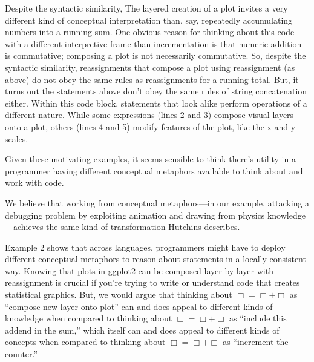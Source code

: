 \begin{Shaded}
\begin{Highlighting}[numbers=left,,]
\StringTok{ }\NormalTok{()}
\StringTok{ }\StringTok{ }
\StringTok{ }\StringTok{ }
\StringTok{ }\StringTok{ }
\StringTok{ }\StringTok{ }
\end{Highlighting}
\end{Shaded}

Despite the syntactic similarity, The
layered creation of a plot invites a very different kind of conceptual
interpretation than, say, repeatedly accumulating numbers into a running
sum. One obvious reason for thinking about this code with a different
interpretive frame than incrementation is that numeric addition is commutative; composing a
plot is not necessarily commutative. So, despite the syntactic similarity, reassignments that
compose a plot using reassignment (as above) do not obey the same
rules as reassignments for a running total. But, it turns out the statements above don't obey the same rules of string concatenation either. Within this code
block, statements that look alike perform operations of a different
nature. While some expressions (lines 2 and 3) compose
visual layers onto a plot, others (lines 4 and 5) modify features of the plot, like the x and y scales.

Given these motivating examples, it seems sensible to think there's
utility in a programmer having different conceptual metaphors available
to think about and work with code.

We believe that working from conceptual metaphors---in our example, attacking a debugging problem by exploiting animation and drawing from physics knowledge---achieves the same kind of transformation Hutchins describes.

Example
2 shows that across languages, programmers might have to deploy
different conceptual metaphors to reason about statements in a
locally-consistent way. Knowing that plots in ggplot2 can be composed
layer-by-layer with reassignment is crucial if you're trying to write or
understand code that creates statistical graphics. But, we would argue
that thinking about $\Box = \Box + \Box$ as ``compose new layer onto plot'' can and
does appeal to different kinds of knowledge when compared to thinking
about $\Box = \Box + \Box$ as ``include this addend in the sum,'' which itself can
and does appeal to different kinds of concepts when compared to thinking
about $\Box = \Box + \Box$ as ``increment the counter.''

